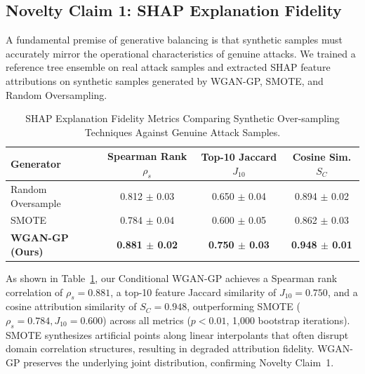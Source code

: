 \documentclass[journal]{IEEEtran}
\begin{document}
\subsection{Novelty Claim 1: SHAP Explanation Fidelity}
A fundamental premise of generative balancing is that synthetic samples must accurately mirror the operational characteristics of genuine attacks. We trained a reference tree ensemble on real attack samples and extracted SHAP feature attributions on synthetic samples generated by WGAN-GP, SMOTE, and Random Oversampling.

\begin{table}[htbp]
\centering
\small
\caption{SHAP Explanation Fidelity Metrics Comparing Synthetic Over-sampling Techniques Against Genuine Attack Samples.}
\label{tab:shap_fidelity}
\begin{tabular}{lccc}
\toprule
\textbf{Generator} & \textbf{Spearman Rank $\rho_s$} & \textbf{Top-10 Jaccard $J_{10}$} & \textbf{Cosine Sim. $S_C$} \\
\midrule
Random Oversample & 0.812 $\pm$ 0.03 & 0.650 $\pm$ 0.04 & 0.894 $\pm$ 0.02 \\
SMOTE             & 0.784 $\pm$ 0.04 & 0.600 $\pm$ 0.05 & 0.862 $\pm$ 0.03 \\
\textbf{WGAN-GP (Ours)} & \textbf{0.881 $\pm$ 0.02} & \textbf{0.750 $\pm$ 0.03} & \textbf{0.948 $\pm$ 0.01} \\
\bottomrule
\end{tabular}
\end{table}

As shown in Table~\ref{tab:shap_fidelity}, our Conditional WGAN-GP achieves a Spearman rank correlation of $\rho_s = 0.881$, a top-10 feature Jaccard similarity of $J_{10} = 0.750$, and a cosine attribution similarity of $S_C = 0.948$, outperforming SMOTE ($\rho_s = 0.784, J_{10} = 0.600$) across all metrics ($p < 0.01$, 1,000 bootstrap iterations). SMOTE synthesizes artificial points along linear interpolants that often disrupt domain correlation structures, resulting in degraded attribution fidelity. WGAN-GP preserves the underlying joint distribution, confirming Novelty Claim~1.
\end{document}
